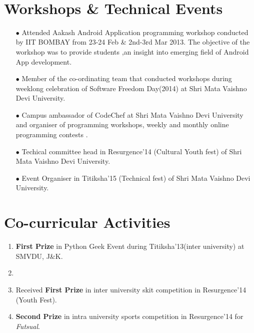 \documentclass[a4paper, oneside, final]{scrartcl} %
\begin{document}
\begin{center}
\begin{tabularx}{0.97\linewidth}{>{\raggedleft\scshape}p{2cm}X}
					 


\end{tabularx}\\

\section{Workshops \& Technical Events}
\begin{itemize}

\item[$\bullet$] {\large Attended Aakash Android Application programming workshop conducted by IIT BOMBAY
from 23-24 Feb \& 2nd-3rd Mar 2013. The objective of the workshop was to provide students
,an insight into emerging field of Android App development.}
\item[$\bullet$] {\large Member of the co-ordinating team that conducted workshops during weeklong celebration of Software Freedom Day(2014) at Shri Mata Vaishno Devi University.}
\item[$\bullet$] {\large Campus ambassador of CodeChef at Shri Mata Vaishno Devi University and organiser of programming workshops, weekly and monthly online programming contests .}
\item[$\bullet$] {\large Techical committee head in Resurgence'14 (Cultural Youth fest) of Shri Mata Vaishno Devi University.}
\item[$\bullet$] {\large Event Organiser in Titiksha'15 (Technical fest) of Shri Mata Vaishno Devi University.}
\end{itemize}

\section{Co-curricular Activities}
\begin{enumerate}
\item {\large {\bfseries First Prize} in Python Geek Event during Titiksha'13(inter university)
at SMVDU, J\&K.}
\item {\large }
\item {\large Received {\bfseries First Prize} in inter university skit competition in Resurgence'14 (Youth Fest).}
\item {\large {\bfseries Second Prize} in intra university sports competition in Resurgence'14 for \textit{Futsual}.}
\end{enumerate}

\end{center}
\end{document}
